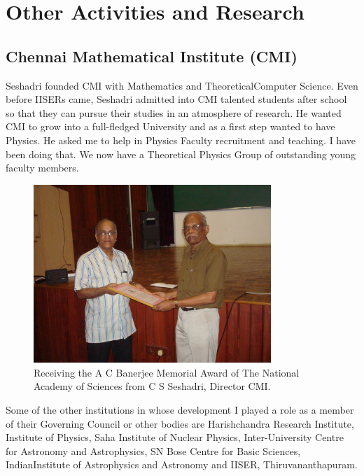 \chapter{Other Activities and Research}

\section*{Chennai Mathematical Institute (CMI)}

Seshadri founded CMI with Mathematics and Theoretical\break Computer Science. 
Even before IISERs came, Seshadri admitted into CMI talented students 
after school so that they can pursue their studies in an atmosphere of 
research. He wanted CMI to grow into a full-fledged University and as a 
first step wanted to have Physics. He asked me to help in Physics 
Faculty recruitment and teaching. I have been doing that. We now have a 
Theoretical Physics Group of outstanding young faculty members.
\medskip

\begin{figure}[h]
\centering
\includegraphics[width=0.8\textwidth]{images/Rajaji-seshadri.jpg}
\caption{\small{Receiving the A C Banerjee Memorial Award of The National\- Academy of Sciences from C S Seshadri, Director CMI.}}
\end{figure}

Some of the other institutions in whose development I played a role as a 
member of their Governing Council or other bodies are Harishchandra 
Research Institute, Institute of Physics, Saha Institute of Nuclear 
Physics, Inter-University Centre for Astro\-nomy and Astrophysics, SN Bose 
Centre for Basic Sciences, Indian\break Institute of Astrophysics and 
Astronomy and IISER, Thiruva\-nanthapuram.

